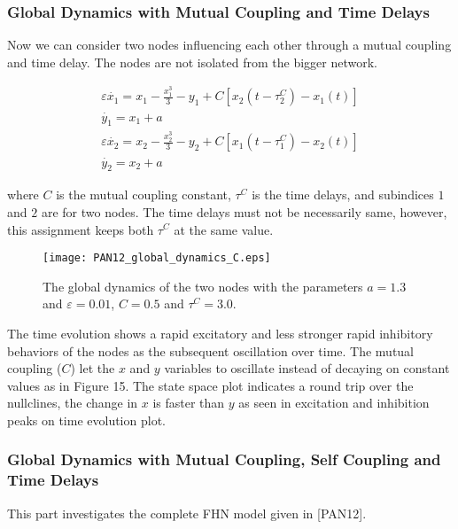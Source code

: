 \subsubsection{Global Dynamics with Mutual Coupling and Time Delays}

Now we can consider two nodes influencing each other through a mutual coupling and time delay. The nodes are not isolated from the bigger network.

\begin{subequations} \begin{align} \varepsilon  \dot{x_1} = x_1 - \frac{x_1^3}{3} -y_1  + C [x_2(t-\tau_2^C)-x_1(t)] \label{eqn: frobenius 10}\\  \dot{y_1} = x_1+a \label{eqn: frobenius 11}  \\ \varepsilon  \dot{x_2} = x_2 - \frac{x_2^3}{3} -y_2  + C [x_1(t-\tau_1^C)-x_2(t)] \label{eqn: frobenius 12}  \\  \dot{y_2} = x_2+a \label{eqn: frobenius 13} 
\end{align} 
\end{subequations}

where $C$ is the mutual coupling constant, $\tau^C$ is the time delays, and subindices $1$ and $2$ are for two nodes. The time delays must not be necessarily same, however, this assignment keeps both $\tau^C$ at the same value.

\begin{figure}[h!]
	\centering
	\texttt{[image: PAN12\_global\_dynamics\_C.eps]}
		\caption{The global dynamics of the two nodes with the parameters $a=1.3$ and $\varepsilon = 0.01$, $C=0.5$ and $\tau^C= 3.0$.}
\end{figure}

 The time evolution shows a rapid excitatory and less stronger rapid inhibitory behaviors of the nodes as the subsequent oscillation over time. The mutual coupling ($C$) let the $x$ and $y$ variables to oscillate instead of decaying on constant values as in Figure 15. The state space plot indicates a round trip over the nullclines, the change in $x$ is faster than $y$ as seen in excitation and inhibition peaks on time evolution plot.
 
\subsubsection{Global Dynamics with Mutual Coupling, Self Coupling and Time Delays}

This part investigates the complete FHN model given in [PAN12].

